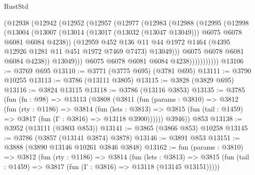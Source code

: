 \begin{lexlean}{RustStd}
\begin{coremodule}
                    (@12938
                      (@12942
                        (@12952
                          (@12957
                            (@12977
                              (@12983
                                (@12988
                                  (@12995
                                    (@12998
                                      (@13004
                                        (@13007
                                          (@13014
                                            (@13017 (@13032 (@13047 @13049)))
                                            @6075
                                            @6078
                                            @6081
                                            @6084
                                            @4238))
                                        (@12959
                                          @452
                                          @136
                                          @11
                                          @44
                                          @1972
                                          @1464
                                          (@4395 @12926 @1281 @11 @451 @1972 @7469 @7473)
                                          @13049)))
                                    @6075
                                    @6078
                                    @6081
                                    @6084
                                    @4238))
                                @13049)))
                          @6075
                          @6078
                          @6081
                          @6084
                          @4238)))))))))))
@13106 := @3769 @695
@13110 := @3771 (@3775 @695) (@3781 @695)
@13111 := @3790 @10255
@13113 := @3786 (@13111 @3805)
@13115 := @3828 (@3829 @695)
@13116 := @3824 @13115
@13118 := @3786 (@13116 @3853)
@13135 := @3785
    (fun (fn : @98) =>
    @13113
      (@3808
        (@3811
          (fun (params : @3810) =>
          @3812
            (fun (rty : @1186) =>
            @3814
              (fun (lets : @3813) =>
              @3815 (fun (tail : @1459) => @3817 (fun (Γ : @3816) => @13118 @3900))))))
        @3946))
    @853
@13138 := @3952 (@13111 (@3803 @853))
@13141 := @3865 (@3866 @853) @10258
@13145 := @3786 (@3857 (@13141 @3874) @3878)
@13146 := @3891 @853
@13151 := @3888 (@3890 @13146 @10261 @3846 @3848)
@13162 := fun (params : @3810) =>
  @3812
    (fun (rty : @1186) =>
    @3814
      (fun (lets : @3813) =>
      @3815 (fun (tail : @1459) => @3817 (fun (Γ : @3816) => @13118 (@13145 @13151)))))

\end{coremodule}
\end{lexlean}
